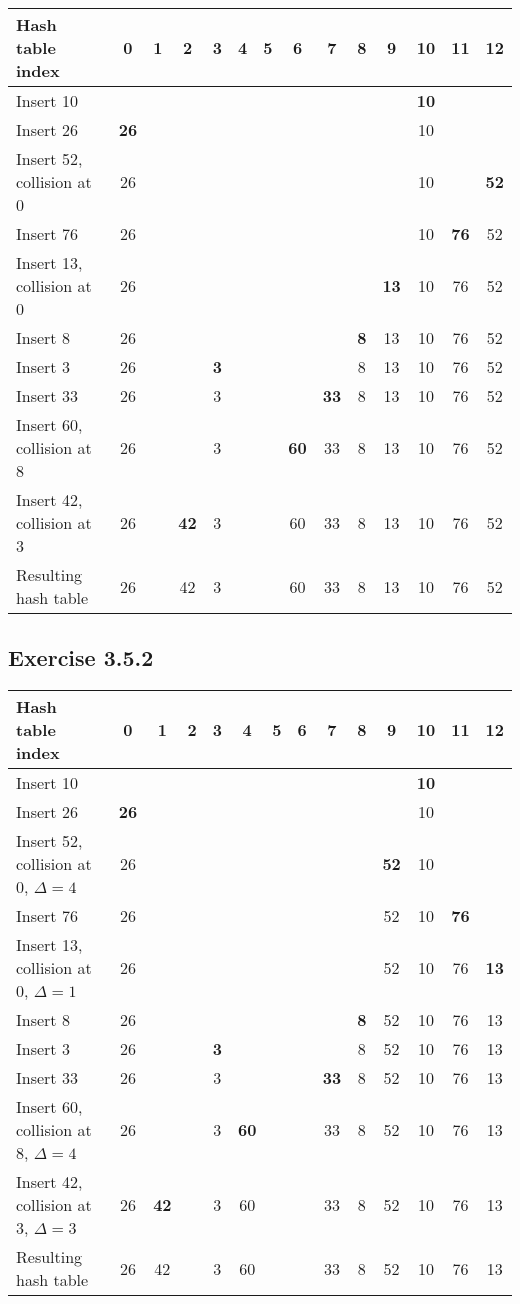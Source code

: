 \documentclass{article}
\begin{document}
\begin{tabular}{|l|c|c|c|c|c|c|c|c|c|c|c|c|c|}
\hline
Hash table index& 0& 1& 2& 3& 4& 5& 6& 7& 8& 9& 10& 11& 12 \\
\hline
Insert 10&&&&&&&&&&& \textbf{10}&& \\
\hline
Insert 26& \textbf{26}&&&&&&&&&& 10&& \\
\hline
Insert 52, collision at 0& 26&&&&&&&&&& 10&& \textbf{52} \\
\hline
Insert 76& 26&&&&&&&&&& 10& \textbf{76}& 52 \\
\hline
Insert 13, collision at 0& 26&&&&&&&&& \textbf{13}& 10& 76& 52 \\
\hline
Insert 8& 26&&&&&&&& \textbf{8}& 13& 10& 76& 52 \\
\hline
Insert 3& 26&&& \textbf{3}&&&&& 8& 13& 10& 76& 52 \\
\hline
Insert 33& 26&&& 3&&&& \textbf{33}& 8& 13& 10& 76& 52 \\
\hline
Insert 60, collision at 8& 26&&& 3&&& \textbf{60}& 33& 8& 13& 10& 76& 52 \\
\hline
Insert 42, collision at 3& 26&& \textbf{42}& 3&&& 60& 33& 8& 13& 10& 76& 52 \\
\hline
Resulting hash table& 26&& 42& 3&&& 60& 33& 8& 13& 10& 76& 52 \\
\hline
\end{tabular}


\subsection*{Exercise 3.5.2}

\begin{tabular}{|l|c|c|c|c|c|c|c|c|c|c|c|c|c|}
\hline
Hash table index& 0& 1& 2& 3& 4& 5& 6& 7& 8& 9& 10& 11& 12 \\
\hline
Insert 10&&&&&&&&&&& \textbf{10}&& \\
\hline
Insert 26& \textbf{26}&&&&&&&&&& 10&& \\
\hline
Insert 52, collision at 0, \(\Delta=4\)& 26&&&&&&&&& \textbf{52}& 10&& \\
\hline
Insert 76& 26&&&&&&&&& 52& 10& \textbf{76}& \\
\hline
Insert 13, collision at 0, \(\Delta=1\)& 26&&&&&&&&& 52& 10& 76& \textbf{13}\\
\hline
Insert 8& 26&&&&&&&& \textbf{8}& 52& 10& 76& 13\\
\hline
Insert 3& 26&&& \textbf{3}&&&&& 8& 52& 10& 76& 13\\
\hline
Insert 33& 26&&& 3&&&& \textbf{33}& 8& 52& 10& 76& 13\\
\hline
Insert 60, collision at 8, \(\Delta=4\)& 26&&& 3& \textbf{60}&&& 33& 8& 52& 10& 76& 13\\
\hline
Insert 42, collision at 3, \(\Delta=3\)& 26& \textbf{42}&& 3& 60&&& 33& 8& 52& 10& 76& 13\\
\hline
Resulting hash table& 26& 42&& 3& 60&&& 33& 8& 52& 10& 76& 13\\
\hline
\end{tabular}
\end{document}
